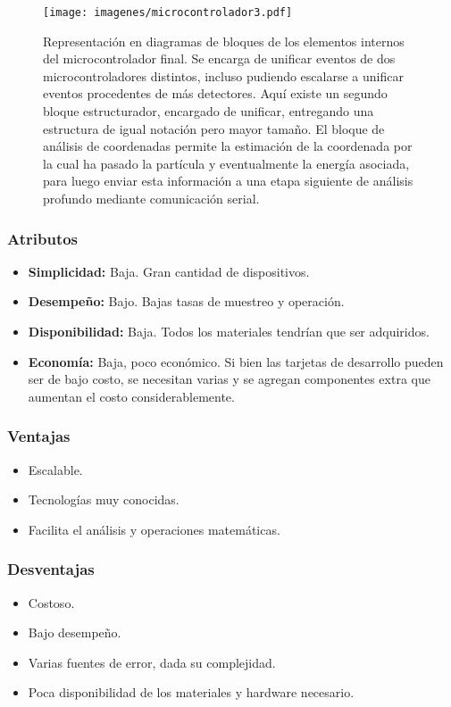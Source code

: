 \begin{figure}[H]
	\centering
	\texttt{[image: imagenes/microcontrolador3.pdf]}
	\caption{Representación en diagramas de bloques de los elementos internos del microcontrolador final. Se encarga de unificar eventos de dos microcontroladores distintos, incluso pudiendo escalarse a unificar eventos procedentes de más detectores. Aquí existe un segundo bloque estructurador, encargado de unificar, entregando una estructura de igual notación pero mayor tamaño. El bloque de análisis de coordenadas permite la estimación de la coordenada por la cual ha pasado la partícula y eventualmente la energía asociada, para luego enviar esta información a una etapa siguiente de análisis profundo mediante comunicación serial.}
	\label{fig:microcontrolador3}
\end{figure}


\newpage
\subsubsection*{Atributos}
\begin{itemize}
	\item \textbf{Simplicidad: } Baja. Gran cantidad de dispositivos.
	\item \textbf{Desempeño: } Bajo. Bajas tasas de muestreo y operación.
	\item \textbf{Disponibilidad: } Baja. Todos los materiales tendrían que ser adquiridos.
	\item \textbf{Economía: } Baja, poco económico. Si bien las tarjetas de desarrollo pueden ser de bajo costo, se necesitan varias y se agregan componentes extra que aumentan el costo considerablemente.
\end{itemize}

\subsubsection*{Ventajas}
\begin{itemize}
	\item Escalable.
	\item Tecnologías muy conocidas.
	\item Facilita el análisis y operaciones matemáticas.
\end{itemize}


\subsubsection*{Desventajas}
\begin{itemize}
	\item Costoso.
	\item Bajo desempeño.
	\item Varias fuentes de error, dada su complejidad.
	\item Poca disponibilidad de los materiales y hardware necesario.
\end{itemize}

